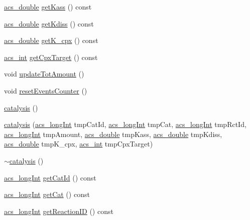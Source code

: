 \begin{DoxyCompactItemize}
\hyperlink{a00050_ab776853a005fcbf56af0424a2a4dd607}{acs\-\_\-double} \hyperlink{a00012_a471d98737d6708b3ac03efba41082d0c}{get\-Kass} () const 
\item 
\hyperlink{a00050_ab776853a005fcbf56af0424a2a4dd607}{acs\-\_\-double} \hyperlink{a00012_ad8b0d5f6410e2256cfefe0db9a10b0af}{get\-Kdiss} () const 
\item 
\hyperlink{a00050_ab776853a005fcbf56af0424a2a4dd607}{acs\-\_\-double} \hyperlink{a00012_a182bfb05b12ddd3613693f6d1f362665}{get\-K\-\_\-cpx} () const 
\item 
\hyperlink{a00050_a8d277355641a098190360234e2ebde35}{acs\-\_\-int} \hyperlink{a00012_a95cce06ac3f63b66d984bd723ab7e561}{get\-Cpx\-Target} () const 
\item 
void \hyperlink{a00012_a9c90e6f2cd9aafd2029ef20a09b95eb2}{update\-Tot\-Amount} ()
\item 
void \hyperlink{a00012_ab8964f8ec17d677de03747520d0a9995}{reset\-Events\-Counter} ()
\item 
\hyperlink{a00012_a7c4d1a67d2745293a17a6bee0df7c5cd}{catalysis} ()
\item 
\hyperlink{a00012_ab6af429c051e2bc9756bac72b99cc4ce}{catalysis} (\hyperlink{a00050_a19319d75f02db4308bc5c0026d98cd85}{acs\-\_\-long\-Int} tmp\-Cat\-Id, \hyperlink{a00050_a19319d75f02db4308bc5c0026d98cd85}{acs\-\_\-long\-Int} tmp\-Cat, \hyperlink{a00050_a19319d75f02db4308bc5c0026d98cd85}{acs\-\_\-long\-Int} tmp\-Rct\-Id, \hyperlink{a00050_a19319d75f02db4308bc5c0026d98cd85}{acs\-\_\-long\-Int} tmp\-Amount, \hyperlink{a00050_ab776853a005fcbf56af0424a2a4dd607}{acs\-\_\-double} tmp\-Kass, \hyperlink{a00050_ab776853a005fcbf56af0424a2a4dd607}{acs\-\_\-double} tmp\-Kdiss, \hyperlink{a00050_ab776853a005fcbf56af0424a2a4dd607}{acs\-\_\-double} tmp\-K\-\_\-cpx, \hyperlink{a00050_a8d277355641a098190360234e2ebde35}{acs\-\_\-int} tmp\-Cpx\-Target)
\item 
\hyperlink{a00012_a982805165c59e95ac055dc24e684fa05}{$\sim$catalysis} ()
\item 
\hyperlink{a00050_a19319d75f02db4308bc5c0026d98cd85}{acs\-\_\-long\-Int} \hyperlink{a00012_a85ba5bd9c758392f245f1277141a1706}{get\-Cat\-Id} () const 
\item 
\hyperlink{a00050_a19319d75f02db4308bc5c0026d98cd85}{acs\-\_\-long\-Int} \hyperlink{a00012_a205e222dff1e80ff8f3195ab22e78726}{get\-Cat} () const 
\item 
\hyperlink{a00050_a19319d75f02db4308bc5c0026d98cd85}{acs\-\_\-long\-Int} \hyperlink{a00012_a6e0eea2f12109b36bb522ac971d1db29}{get\-Reaction\-I\-D} () const 

\end{DoxyCompactItemize}
